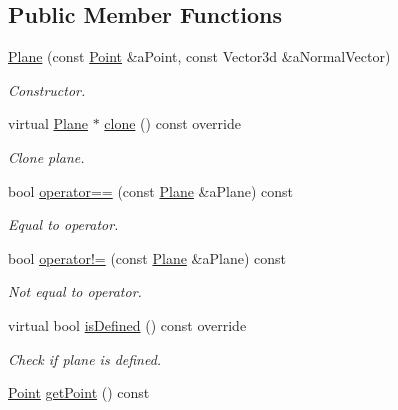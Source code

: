 \subsection*{Public Member Functions}
\begin{DoxyCompactItemize}
\item 
\hyperlink{classlibrary_1_1math_1_1geom_1_1d3_1_1objects_1_1_plane_a81fe78a983e2cb6ee6ad9bfabd22c3a4}{Plane} (const \hyperlink{classlibrary_1_1math_1_1geom_1_1d3_1_1objects_1_1_point}{Point} \&a\+Point, const Vector3d \&a\+Normal\+Vector)
\begin{DoxyCompactList}\small\item\em Constructor. \end{DoxyCompactList}\item 
virtual \hyperlink{classlibrary_1_1math_1_1geom_1_1d3_1_1objects_1_1_plane}{Plane} $\ast$ \hyperlink{classlibrary_1_1math_1_1geom_1_1d3_1_1objects_1_1_plane_a7ceb970c35968551600e2380795a0a4c}{clone} () const override
\begin{DoxyCompactList}\small\item\em Clone plane. \end{DoxyCompactList}\item 
bool \hyperlink{classlibrary_1_1math_1_1geom_1_1d3_1_1objects_1_1_plane_a9391589825cac1db971b39452b38f8ea}{operator==} (const \hyperlink{classlibrary_1_1math_1_1geom_1_1d3_1_1objects_1_1_plane}{Plane} \&a\+Plane) const
\begin{DoxyCompactList}\small\item\em Equal to operator. \end{DoxyCompactList}\item 
bool \hyperlink{classlibrary_1_1math_1_1geom_1_1d3_1_1objects_1_1_plane_a5dfafb90b0da2cc239092ea6c655ec2a}{operator!=} (const \hyperlink{classlibrary_1_1math_1_1geom_1_1d3_1_1objects_1_1_plane}{Plane} \&a\+Plane) const
\begin{DoxyCompactList}\small\item\em Not equal to operator. \end{DoxyCompactList}\item 
virtual bool \hyperlink{classlibrary_1_1math_1_1geom_1_1d3_1_1objects_1_1_plane_a151515bf70e661c008023672e716e10a}{is\+Defined} () const override
\begin{DoxyCompactList}\small\item\em Check if plane is defined. \end{DoxyCompactList}\item 
\hyperlink{classlibrary_1_1math_1_1geom_1_1d3_1_1objects_1_1_point}{Point} \hyperlink{classlibrary_1_1math_1_1geom_1_1d3_1_1objects_1_1_plane_a52f9167ca123019c4b303c19b696b886}{get\+Point} () const

\end{DoxyCompactItemize}
